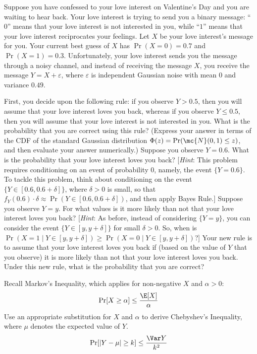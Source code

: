 Suppose you have confessed to your love interest on Valentine's Day and you are waiting to hear back.
Your love interest is trying to send you a binary message: ``$0$'' means that your love interest is not interested in you, while ``$1$'' means that your love interest reciprocates your feelings.
Let $X$ be your love interest's message for you.
Your current best guess of $X$ has $\Pr(X = 0) = 0.7$ and $\Pr(X = 1) = 0.3$.
Unfortunately, your love interest sends you the message through a noisy channel, and instead of receiving the message $X$, you receive the message $Y = X + \varepsilon$, where $\varepsilon$ is independent Gaussian noise with mean $0$ and variance $0.49$.
\begin{Parts}
    \Part First, you decide upon the following rule: if you observe $Y > 0.5$, then you will assume that your love interest loves you back, whereas if you observe $Y \le 0.5$, then you will assume that your love interest is not interested in you.
    What is the probability that you are correct using this rule?
    (Express your answer in terms of the CDF of the standard Gaussian distribution $\Phi(z) = \Pr(\mc{N}(0, 1) \le z)$, and then evaluate your answer numerically.)
    \Part Suppose you observe $Y = 0.6$.
    What is the probability that your love interest loves you back?
    [\textit{Hint}: This problem requires conditioning on an event of probability $0$, namely, the event $\{Y = 0.6\}$.
    To tackle this problem, think about conditioning on the event $\{Y \in [0.6, 0.6 + \delta]\}$, where $\delta > 0$ is small, so that $f_Y(0.6) \cdot \delta \approx \Pr(Y \in [0.6, 0.6 + \delta])$, and then apply Bayes Rule.]
    \Part Suppose you observe $Y = y$.
    For what values is it more likely than not that your love interest loves you back?
    [\textit{Hint}: As before, instead of considering $\{Y = y\}$, you can consider the event $\{Y \in [y, y + \delta]\}$ for small $\delta > 0$.
    So, when is $\Pr(X = 1 \mid Y \in [y, y + \delta]) \ge \Pr(X = 0 \mid Y \in [y, y + \delta])$?]
    \Part Your new rule is to assume that your love interest loves you back if (based on the value of $Y$ that you observe) it is more likely than not that your love interest loves you back.
    Under this new rule, what is the probability that you are correct?
\end{Parts}



Recall Markov's Inequality, which applies for non-negative $X$ and $\alpha > 0$: $$\Pr[X\geq\alpha]\leq\frac{\E[X]}{\alpha}$$
Use an appropriate substitution for $X$ and $\alpha$ to derive Chebyshev's Inequality, where $\mu$ denotes the expected value of $Y$.
$$\Pr[|Y-\mu|\geq k]\leq\frac{\Var Y}{k^2}$$
\nosolspace{0.5cm}




